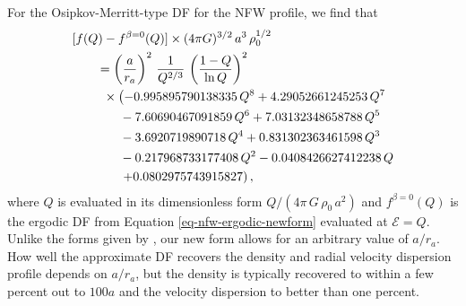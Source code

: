 For the Osipkov-Merritt-type DF for the NFW profile, we find that 
\begin{equation}
\begin{split}
    \huge[f(Q)&-f^{\beta=0}(Q)\huge]\times(4\pi G)^{3/2}\,a^3\,\rho_0^{1/2} \\&\!\!\!=  \left({a \over r_a}\right)^2\, {1 \over Q^{2/3}}\,\left({1-Q \over \ln Q}\right)^2\,\\
    & \times \left(- 0.995895790138335 \,Q^{8} + 4.29052661245253 \,Q^{7}\right.\\&\quad\
    - 7.60690467091859\, Q^{6} + 7.03132348658788\, Q^{5}\\&\quad\ - 3.6920719890718\, Q^{4} + 0.831302363461598\, Q^{3}\\&\quad\ - 0.217968733177408\, Q^{2} - 0.0408426627412238\, Q\\&\quad\ \left.+ 0.0802975743915827\right),
\end{split}
\end{equation}
where $Q$ is evaluated in its dimensionless form $Q/(4\pi\,G\,\rho_0\,a^2)$ and $f^{\beta=0}(Q)$ is the ergodic DF from Equation \eqref{eq-nfw-ergodic-newform} evaluated at $\mathcal{E} = Q$. Unlike the forms given by \citet{Widrow00a}, our new form allows for an arbitrary value of $a/r_a$. How well the approximate DF recovers the density and radial velocity dispersion profile depends on $a/r_a$, but the density is typically recovered to within a few percent out to $100a$ and the velocity dispersion to better than one percent.



\bsp	%
\label{lastpage}


